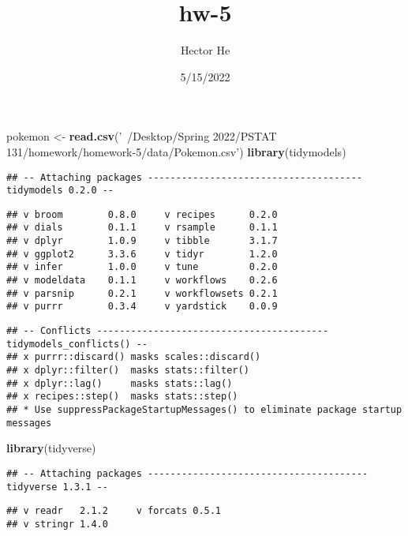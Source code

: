 \documentclass[]{article}
\title{hw-5}
\author{Hector He}
\date{5/15/2022}
\newenvironment{Shaded}{\begin{snugshade}}{\end{snugshade}}
\newcommand{\KeywordTok}[1]{\textcolor[rgb]{0.13,0.29,0.53}{\textbf{#1}}}
\newcommand{\NormalTok}[1]{#1}
\newcommand{\StringTok}[1]{\textcolor[rgb]{0.31,0.60,0.02}{#1}}
\begin{document}
\maketitle

\begin{Shaded}
\begin{Highlighting}[]
\NormalTok{pokemon <-}\StringTok{ }\KeywordTok{read.csv}\NormalTok{(}\StringTok{'~/Desktop/Spring 2022/PSTAT 131/homework/homework-5/data/Pokemon.csv'}\NormalTok{)}
\KeywordTok{library}\NormalTok{(tidymodels)}
\end{Highlighting}
\end{Shaded}

\begin{verbatim}
## -- Attaching packages -------------------------------------- tidymodels 0.2.0 --
\end{verbatim}

\begin{verbatim}
## v broom        0.8.0     v recipes      0.2.0
## v dials        0.1.1     v rsample      0.1.1
## v dplyr        1.0.9     v tibble       3.1.7
## v ggplot2      3.3.6     v tidyr        1.2.0
## v infer        1.0.0     v tune         0.2.0
## v modeldata    0.1.1     v workflows    0.2.6
## v parsnip      0.2.1     v workflowsets 0.2.1
## v purrr        0.3.4     v yardstick    0.0.9
\end{verbatim}

\begin{verbatim}
## -- Conflicts ----------------------------------------- tidymodels_conflicts() --
## x purrr::discard() masks scales::discard()
## x dplyr::filter()  masks stats::filter()
## x dplyr::lag()     masks stats::lag()
## x recipes::step()  masks stats::step()
## * Use suppressPackageStartupMessages() to eliminate package startup messages
\end{verbatim}

\begin{Shaded}
\begin{Highlighting}[]
\KeywordTok{library}\NormalTok{(tidyverse)}
\end{Highlighting}
\end{Shaded}

\begin{verbatim}
## -- Attaching packages --------------------------------------- tidyverse 1.3.1 --
\end{verbatim}

\begin{verbatim}
## v readr   2.1.2     v forcats 0.5.1
## v stringr 1.4.0
\end{verbatim}
\end{document}

